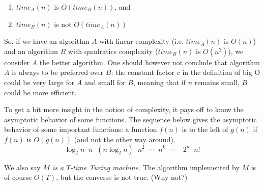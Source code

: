 \begin{enumerate}
\item $time_A(n)$ is $O(time_B(n))$, and
\item $time_B(n)$ is not $O(time_A(n))$
\end{enumerate}

So, if we have an algorithm $A$ with linear complexity
(i.e. $time_A(n)$ is $O(n)$) and an algorithm $B$ with quadratics
complexity  ($time_B(n)$ is $O(n^2)$), we consider $A$ the
better algorithm.  One should however not conclude that algorithm $A$
is always to be preferred over $B$: the constant factor $c$ in the
definition of big O could be very large for $A$ and small for $B$,
meaning that if $n$ remains small, $B$ could be more efficient.

To get a bit more insight in the notion of complexity, it pays off to
know the asymptotic behavior of some functions. The sequence below
gives the asymptotic behavior of some important functions: a function
$f(n)$ is to the left of $g(n)$ if $f(n)$ is $O(g(n))$ (and not the
other way around).
\[ \log_2 n \;\; n\;\; (n\log_2 n)\;\;  n^2\;\; \cdots\;\; n^k\;\;
\cdots\;\; \;\;2^n \;\; n!  \]





We also say {\em $M$ is a $T$-time Turing machine}. The algorithm
implemented by $M$ is of course $O(T)$, but the converse is not
true. (Why not?)







